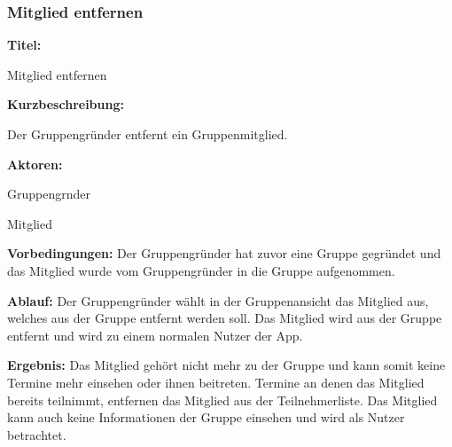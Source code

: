\documentclass{scrartcl}
\begin{document}
	\subsubsection{Mitglied entfernen}
	\begin{description}
		\item \textbf{Titel:}
		\begin{description}
			\item Mitglied entfernen
		\end{description}
		\item \textbf{Kurzbeschreibung:}
		\begin{description}
			\item Der Gruppengründer entfernt ein Gruppenmitglied.
		\end{description}
		\item \textbf{Aktoren:}
		\begin{description}
			\item \gls{Gruppengrnder}
			\item \gls{Mitglied}
		\end{description}
		\item \textbf{Vorbedingungen:} \newline Der Gruppengründer hat zuvor eine Gruppe gegründet und das Mitglied wurde vom Gruppengründer in die Gruppe aufgenommen.
		\item \textbf{Ablauf:} \newline Der Gruppengründer wählt in der Gruppenansicht das Mitglied aus, welches aus der Gruppe entfernt werden soll. Das Mitglied wird aus der Gruppe entfernt und wird zu einem normalen Nutzer der App.
		\item \textbf{Ergebnis:} \newline Das Mitglied gehört nicht mehr zu der Gruppe und kann somit keine Termine mehr einsehen oder ihnen beitreten. Termine an denen das Mitglied bereits teilnimmt, entfernen das Mitglied aus der Teilnehmerliste. Das Mitglied kann auch keine Informationen der Gruppe einsehen und wird als Nutzer betrachtet.
	\end{description}
	
	\newpage
	
\end{document}
